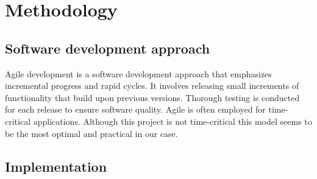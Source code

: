     \chapter{Methodology}
       \section{Software development approach}
        Agile development is a software development approach that emphasizes incremental progress and rapid cycles. It involves releasing small increments of functionality that build upon previous versions. Thorough testing is conducted for each release to ensure software quality. Agile is often employed for time-critical applications. Although this project is not time-critical this model seems to be the most optimal and practical in our case.
        \begin{figure}[hbt!]
        \end{figure}

        \section{Implementation}

